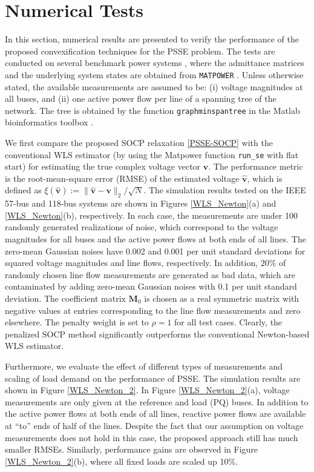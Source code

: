 \documentclass[journal,twoside]{IEEEtran}
\newcommand{\bv}{\mathbf{v}}
\begin{document}
\section{Numerical Tests}\label{sec:test}

In this section, numerical results are presented to verify the performance of the proposed convexification techniques for
the PSSE problem. The tests are conducted on several benchmark power systems \cite{Josz16}, where the admittance matrices and the
underlying system states are obtained from \texttt{MATPOWER} \cite{matpower}.
Unless otherwise stated, the available measurements are assumed to be: (i) voltage magnitudes at all buses, and
(ii) one active power flow per line of a spanning tree of the network.
 The tree is obtained by the function \texttt{graphminspantree} in the Matlab bioinformatics toolbox \cite{matlabMST}.


We first compare the proposed SOCP relaxation \eqref{PSSE-SOCP} with the conventional WLS estimator (by using the Matpower function \texttt{run\_se} with flat start) for estimating the true complex voltage vector $\bv$. The performance metric is the root-mean-square error (RMSE) of the estimated voltage $\hat{\bv}$, which is defined as $\xi(\hat{\bv}):=\|\hat{\bv}-\bv\|_2/\sqrt{N}$.
The simulation results tested on the IEEE 57-bus and 118-bus systems are shown in Figures \ref{WLS_Newton}(a) and \ref{WLS_Newton}(b), respectively.
In each case, the measurements are under 100 randomly generated realizations of noise, which correspond to the voltage magnitudes for all buses and the active power flows at both ends of all lines. The zero-mean Gaussian noises have 0.002 and 0.001 per unit standard deviations for squared voltage magnitudes and line flows, respectively. In addition, $20\%$ of randomly chosen line flow measurements are generated as bad data,
which are contaminated by adding zero-mean Gaussian noises with 0.1 per unit standard deviation.
The coefficient matrix $\mathbf{M}_0$ is chosen as a real symmetric matrix with negative values at entries corresponding to the line flow measurements and zero elsewhere. The penalty weight is set to $\rho=1$ for all test cases.
Clearly, the penalized SOCP method significantly outperforms the conventional Newton-based WLS estimator.

Furthermore, we evaluate the effect of different types of measurements and scaling of load demand on the performance of PSSE. The simulation results are shown in Figure \ref{WLS_Newton_2}. In Figure \ref{WLS_Newton_2}(a), voltage measurements are only given at the reference and load (PQ) buses. 
In addition to the active power flows at both ends of all lines, reactive power flows are available at ``to'' ends of half of the lines.  Despite the fact that our assumption on voltage measurements does not hold in this case,
the proposed approach still has much smaller RMSEs. Similarly, performance gains are observed in Figure \ref{WLS_Newton_2}(b), where all fixed loads are scaled up 10\%. 
\end{document}
